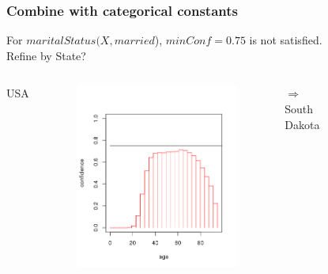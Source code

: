 \documentclass{beamer}
\begin{document}
\begin{frame}
\frametitle{Combine with categorical constants}
  For $maritalStatus(X,married$), $minConf=0.75$ is not satisfied. \\
  Refine by State? 

  \begin{columns}[c]
      \center USA
      \begin{figure}
      \includegraphics[width=1\linewidth]{./Figures/age-married-minConf.png}
      \end{figure}
      $\Rightarrow$
      \center South Dakota
      \begin{figure}

\end{figure}
\end{columns}
\end{frame}
\end{document}
